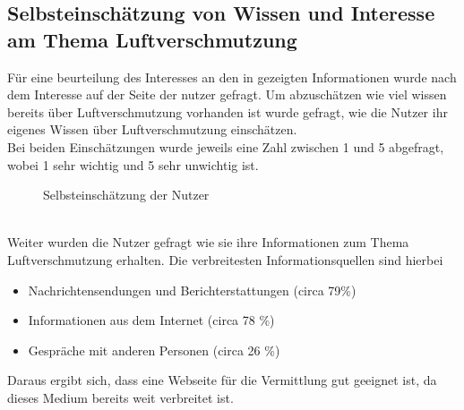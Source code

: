 \subsection{Selbsteinschätzung von Wissen und Interesse am Thema Luftverschmutzung}
Für eine beurteilung des Interesses an den in \softwarename gezeigten Informationen wurde nach dem Interesse auf der Seite der nutzer gefragt.
Um abzuschätzen wie viel wissen bereits über Luftverschmutzung vorhanden ist wurde gefragt, wie die Nutzer ihr eigenes Wissen über Luftverschmutzung einschätzen.
\\
Bei beiden Einschätzungen wurde jeweils eine Zahl zwischen 1 und 5 abgefragt, wobei 1 sehr wichtig und 5 sehr unwichtig ist.
\\
\begin{figure}[h]
    \caption{Selbsteinschätzung der Nutzer}
\end{figure}
\\
Weiter wurden die Nutzer gefragt wie sie ihre Informationen zum Thema Luftverschmutzung erhalten. Die verbreitesten Informationsquellen sind hierbei
\begin{itemize} [noitemsep]
    \item Nachrichtensendungen und Berichterstattungen (circa 79\%)
    \item Informationen aus dem Internet (circa 78 \%)
    \item Gespräche mit anderen Personen (circa 26 \%)
\end{itemize}
Daraus ergibt sich, dass eine Webseite für die Vermittlung gut geeignet ist, da dieses Medium bereits weit verbreitet ist.

